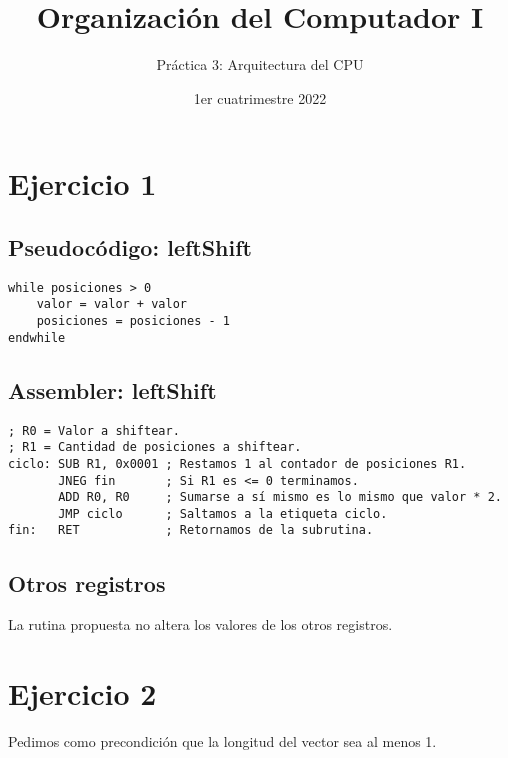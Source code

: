 

\title{Organización del Computador I}
\author{Práctica 3: Arquitectura del CPU}
\date{1er cuatrimestre 2022}



\maketitle
\tableofcontents
\newpage

\section{Ejercicio 1}

\subsection{Pseudocódigo: leftShift}

\begin{lstlisting}
while posiciones > 0
    valor = valor + valor
    posiciones = posiciones - 1
endwhile
\end{lstlisting}

\subsection{Assembler: leftShift}

\begin{lstlisting}
; R0 = Valor a shiftear.
; R1 = Cantidad de posiciones a shiftear.
ciclo: SUB R1, 0x0001 ; Restamos 1 al contador de posiciones R1.
       JNEG fin       ; Si R1 es <= 0 terminamos.
       ADD R0, R0     ; Sumarse a sí mismo es lo mismo que valor * 2.
       JMP ciclo      ; Saltamos a la etiqueta ciclo.
fin:   RET            ; Retornamos de la subrutina.
\end{lstlisting}

\subsection{Otros registros}

La rutina propuesta no altera los valores de los otros registros.

\section{Ejercicio 2}

Pedimos como precondición que la longitud del vector sea al menos 1.

